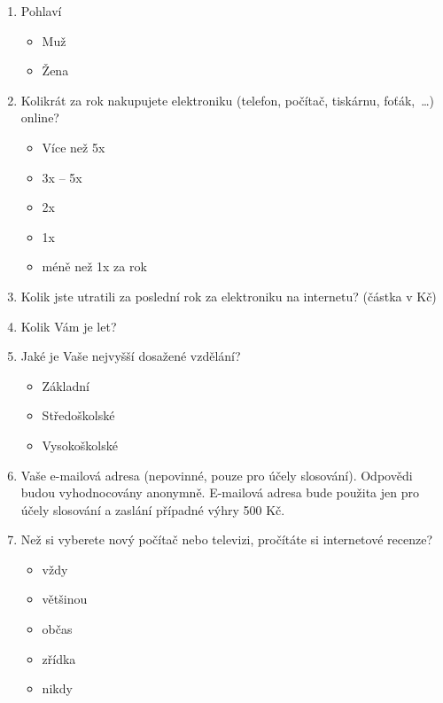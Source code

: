 \documentclass[12pt,oneside,openany]{fithesis}
\begin{document}
\begin{enumerate}

  \item Pohlaví
    \begin{itemize}
       \item Muž
       \item Žena
    \end{itemize}

  \item Kolikrát za rok nakupujete elektroniku (telefon, počítač, tiskárnu, foťák,~\ldots) online?
    \begin{itemize}
       \item Více než 5x
       \item 3x – 5x
       \item 2x
       \item 1x
       \item méně než 1x za rok
    \end{itemize}

  \item Kolik jste utratili za poslední rok za elektroniku na internetu? (částka v Kč)

  \item Kolik Vám je let?

  \item Jaké je Vaše nejvyšší dosažené vzdělání?
    \begin{itemize}
       \item Základní
       \item Středoškolské
       \item Vysokoškolské
    \end{itemize}

  \item Vaše e-mailová adresa (nepovinné, pouze pro účely slosování). 
      Odpovědi budou vyhodnocovány anonymně. 
      E-mailová adresa bude použita jen pro účely slosování a zaslání případné výhry 500 Kč.

  \item Než si vyberete nový počítač nebo televizi, pročítáte si internetové recenze?
    \begin{itemize}
       \item vždy
       \item většinou
       \item občas
       \item zřídka
       \item nikdy
    \end{itemize}


\end{enumerate}
\end{document}
